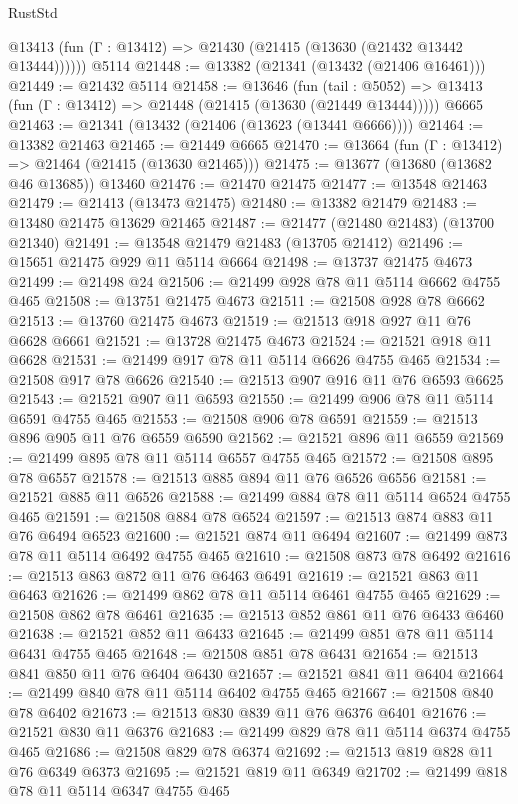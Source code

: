 \begin{lexlean}{RustStd}
\begin{coremodule}
      @13413 (fun (Γ : @13412) => @21430 (@21415 (@13630 (@21432 @13442 @13444))))))
    @5114
@21448 := @13382 (@21341 (@13432 (@21406 @16461)))
@21449 := @21432 @5114
@21458 := @13646
    (fun (tail : @5052) => @13413 (fun (Γ : @13412) => @21448 (@21415 (@13630 (@21449 @13444)))))
    @6665
@21463 := @21341 (@13432 (@21406 (@13623 (@13441 @6666))))
@21464 := @13382 @21463
@21465 := @21449 @6665
@21470 := @13664 (fun (Γ : @13412) => @21464 (@21415 (@13630 @21465)))
@21475 := @13677 (@13680 (@13682 @46 @13685)) @13460
@21476 := @21470 @21475
@21477 := @13548 @21463
@21479 := @21413 (@13473 @21475)
@21480 := @13382 @21479
@21483 := @13480 @21475 @13629 @21465
@21487 := @21477 (@21480 @21483) (@13700 @21340)
@21491 := @13548 @21479 @21483 (@13705 @21412)
@21496 := @15651 @21475 @929 @11 @5114 @6664
@21498 := @13737 @21475 @4673
@21499 := @21498 @24
@21506 := @21499 @928 @78 @11 @5114 @6662 @4755 @465
@21508 := @13751 @21475 @4673
@21511 := @21508 @928 @78 @6662
@21513 := @13760 @21475 @4673
@21519 := @21513 @918 @927 @11 @76 @6628 @6661
@21521 := @13728 @21475 @4673
@21524 := @21521 @918 @11 @6628
@21531 := @21499 @917 @78 @11 @5114 @6626 @4755 @465
@21534 := @21508 @917 @78 @6626
@21540 := @21513 @907 @916 @11 @76 @6593 @6625
@21543 := @21521 @907 @11 @6593
@21550 := @21499 @906 @78 @11 @5114 @6591 @4755 @465
@21553 := @21508 @906 @78 @6591
@21559 := @21513 @896 @905 @11 @76 @6559 @6590
@21562 := @21521 @896 @11 @6559
@21569 := @21499 @895 @78 @11 @5114 @6557 @4755 @465
@21572 := @21508 @895 @78 @6557
@21578 := @21513 @885 @894 @11 @76 @6526 @6556
@21581 := @21521 @885 @11 @6526
@21588 := @21499 @884 @78 @11 @5114 @6524 @4755 @465
@21591 := @21508 @884 @78 @6524
@21597 := @21513 @874 @883 @11 @76 @6494 @6523
@21600 := @21521 @874 @11 @6494
@21607 := @21499 @873 @78 @11 @5114 @6492 @4755 @465
@21610 := @21508 @873 @78 @6492
@21616 := @21513 @863 @872 @11 @76 @6463 @6491
@21619 := @21521 @863 @11 @6463
@21626 := @21499 @862 @78 @11 @5114 @6461 @4755 @465
@21629 := @21508 @862 @78 @6461
@21635 := @21513 @852 @861 @11 @76 @6433 @6460
@21638 := @21521 @852 @11 @6433
@21645 := @21499 @851 @78 @11 @5114 @6431 @4755 @465
@21648 := @21508 @851 @78 @6431
@21654 := @21513 @841 @850 @11 @76 @6404 @6430
@21657 := @21521 @841 @11 @6404
@21664 := @21499 @840 @78 @11 @5114 @6402 @4755 @465
@21667 := @21508 @840 @78 @6402
@21673 := @21513 @830 @839 @11 @76 @6376 @6401
@21676 := @21521 @830 @11 @6376
@21683 := @21499 @829 @78 @11 @5114 @6374 @4755 @465
@21686 := @21508 @829 @78 @6374
@21692 := @21513 @819 @828 @11 @76 @6349 @6373
@21695 := @21521 @819 @11 @6349
@21702 := @21499 @818 @78 @11 @5114 @6347 @4755 @465

\end{coremodule}
\end{lexlean}
